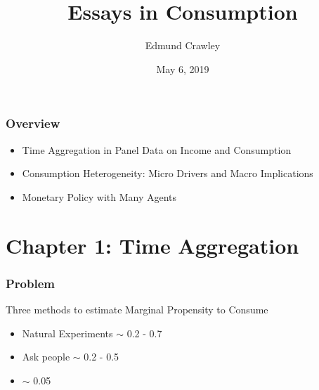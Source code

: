 \documentclass{beamer}
\title[Essays in Consumption]{Essays in Consumption}
\author{Edmund Crawley}
\date[05/06/2019]{May 6, 2019}
\begin{document}
\newcommand*\circled[1]{\tikz[baseline=(char.base)]{
		\node[shape=circle,draw,inner sep=2pt] (char) {#1};}}
\begin{frame}[plain]
\titlepage
\end{frame}
\frame
{
	\frametitle{Overview}
	\setlength{\leftmargini}{2.5cm}
	\begin{itemize}
	\item<1->[Chapter 1]{Time Aggregation in Panel Data on Income and Consumption}
	\item<2->[Chapter 2]{Consumption Heterogeneity: Micro Drivers and Macro Implications}
	\item<3->[Chapter 3]{Monetary Policy with Many Agents}
	\end{itemize}
}
\section{Chapter 1: Time Aggregation}
\frame
{
	\frametitle{Problem}
	Three methods to estimate Marginal Propensity to Consume
	\begin{itemize}
	\item<2-> Natural Experiments $\sim$ 0.2 - 0.7
	\item<3-> Ask people $\sim$ 0.2 - 0.5
	\item<4-> \cite{blundell_consumption_2008} $\sim$ 0.05 
\end{itemize}
}
\frame[t]
\end{document}
